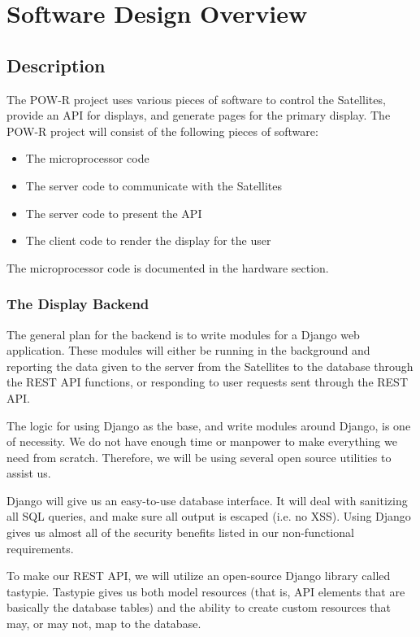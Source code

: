 
\chapter{Software Design Overview}

\section{Description}

The POW-R project uses various pieces of software to control the Satellites, provide an API for displays, and generate pages for the primary display.
The POW-R project will consist of the following pieces of software:
\begin{itemize}
 \item The microprocessor code
 \item The server code to communicate with the Satellites
 \item The server code to present the API
 \item The client code to render the display for the user
\end{itemize}

The microprocessor code is documented in the hardware section.

\subsection{The Display Backend}

The general plan for the backend is to write modules for a Django web application.
These modules will either be running in the background and reporting the data given to the server from the Satellites to the database through the REST API functions, or responding to user requests sent through the REST API.

The logic for using Django as the base, and write modules around Django, is one of necessity.
We do not have enough time or manpower to make everything we need from scratch.
Therefore, we will be using several open source utilities to assist us.


Django will give us an easy-to-use database interface.
It will deal with sanitizing all SQL queries, and make sure all output is escaped (i.e. no XSS).
Using Django gives us almost all of the security benefits listed in our non-functional requirements.

To make our REST API, we will utilize an open-source Django library called tastypie.
Tastypie gives us both model resources (that is, API elements that are basically the database tables) and the ability to create custom resources that may, or may not, map to the database.

